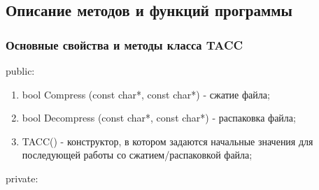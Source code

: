 \documentclass[12pt]{article}
\begin{document}
\subsection*{Описание методов и функций программы}
 
\subsubsection*{Основные свойства и методы класса TACC}
\noindent
public:

\begin{enumerate}
	\item bool Compress (const char*, const char*) - сжатие файла;
	\item bool Decompress (const char*, const char*) - распаковка файла;
	\item TACC() - конструктор, в котором задаются начальные значения для последующей работы со сжатием/распаковкой файла;
\end{enumerate}
\noindent
private:
\end{document}
